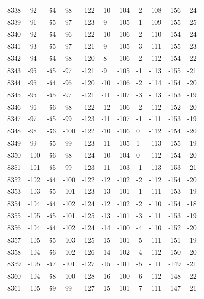 \begin{table}[H]
\begin{tabular}{lllllllllll}
8338 & -92 & -64 & -98 & -122 & -10 & -104 & -2 & -108 & -156 & -24 \\
8339 & -91 & -65 & -97 & -123 & -9 & -105 & -1 & -109 & -155 & -25 \\
8340 & -92 & -64 & -96 & -122 & -10 & -106 & -2 & -110 & -154 & -24 \\
8341 & -93 & -65 & -97 & -121 & -9 & -105 & -3 & -111 & -155 & -23 \\
8342 & -94 & -64 & -98 & -120 & -8 & -106 & -2 & -112 & -154 & -22 \\
8343 & -95 & -65 & -97 & -121 & -9 & -105 & -1 & -113 & -155 & -21 \\
8344 & -96 & -64 & -96 & -120 & -10 & -106 & -2 & -114 & -154 & -20 \\
8345 & -95 & -65 & -97 & -121 & -11 & -107 & -3 & -113 & -153 & -19 \\
8346 & -96 & -66 & -98 & -122 & -12 & -106 & -2 & -112 & -152 & -20 \\
8347 & -97 & -65 & -99 & -123 & -11 & -107 & -1 & -111 & -153 & -19 \\
8348 & -98 & -66 & -100 & -122 & -10 & -106 & 0 & -112 & -154 & -20 \\
8349 & -99 & -65 & -99 & -123 & -11 & -105 & 1 & -113 & -155 & -19 \\
8350 & -100 & -66 & -98 & -124 & -10 & -104 & 0 & -112 & -154 & -20 \\
8351 & -101 & -65 & -99 & -123 & -11 & -103 & -1 & -113 & -153 & -21 \\
8352 & -102 & -64 & -100 & -122 & -12 & -102 & -2 & -112 & -154 & -20 \\
8353 & -103 & -65 & -101 & -123 & -13 & -101 & -1 & -111 & -153 & -19 \\
8354 & -104 & -64 & -102 & -124 & -12 & -102 & -2 & -110 & -154 & -18 \\
8355 & -105 & -65 & -101 & -125 & -13 & -101 & -3 & -111 & -153 & -19 \\
8356 & -104 & -64 & -102 & -124 & -14 & -100 & -4 & -110 & -152 & -20 \\
8357 & -105 & -65 & -103 & -125 & -15 & -101 & -5 & -111 & -151 & -19 \\
8358 & -104 & -66 & -102 & -126 & -14 & -102 & -4 & -112 & -150 & -20 \\
8359 & -105 & -67 & -101 & -127 & -15 & -101 & -5 & -111 & -149 & -21 \\
8360 & -104 & -68 & -100 & -128 & -16 & -100 & -6 & -112 & -148 & -22 \\
8361 & -105 & -69 & -99 & -127 & -15 & -101 & -7 & -111 & -147 & -21 \\

\end{tabular}
\end{table}
